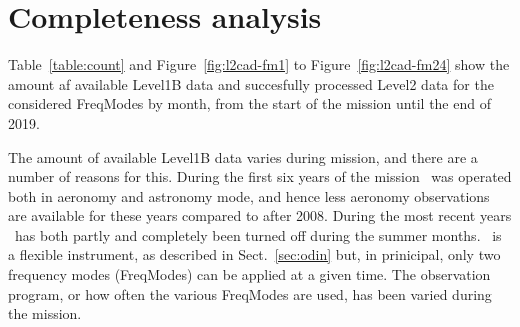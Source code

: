 \chapter{Completeness analysis}
\label{chapter:cad}


\begin{table}
\caption{ \textbf{To be updated.} \smr\ Level1B and Level2 data count by frequency mode.
Level2 data are further categorized into two classes: "All-Level2" and "Ok-Level2",
where "Ok-Level2" means that the Level2 processing produced a result with a valid
quality.
Column "succes rate - Level2" and "succes rate - Ok Level2" describes the fraction of
"Level2 count - All" over "Level1B count" and "Level2 count - ok" over "Level2 count - All".}
\label{table:count}
\end{table}


Table~\ref{table:count} and Figure~\ref{fig:l2cad-fm1} to
Figure~\ref{fig:l2cad-fm24} show the amount af available Level1B
data and succesfully processed Level2 data for the considered
FreqModes by month, from the start of the mission until the
end of 2019. 

The amount of available Level1B data varies during mission,
and there are a number of reasons for this.
During the first six years of the mission \smr\ was operated
both in aeronomy and astronomy mode, and hence less
aeronomy observations are available for these years
compared to after 2008.  
During the most recent years \smr\ has both partly and completely
been turned off during the summer months.
\smr\ is a flexible instrument, as described in Sect.~\ref{sec:odin}
but, in prinicipal, only two frequency modes (FreqModes)
can be applied at a given time. The observation program, or how
often the various FreqModes are used, has been varied during the
mission.


